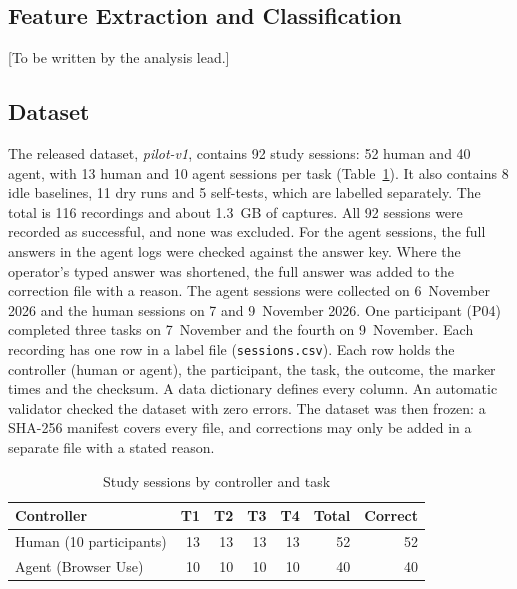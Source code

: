 \subsection{Feature Extraction and Classification}
\label{sec:method-analysis}
[To be written by the analysis lead.]

\subsection{Dataset}
\label{sec:method-dataset}
The released dataset, \textit{pilot-v1}, contains 92 study sessions: 52 human and 40 agent, with 13 human and 10 agent sessions per task (Table~\ref{tab:dataset}). It also contains 8 idle baselines, 11 dry runs and 5 self-tests, which are labelled separately. The total is 116 recordings and about 1.3~GB of captures. All 92 sessions were recorded as successful, and none was excluded. For the agent sessions, the full answers in the agent logs were checked against the answer key. Where the operator's typed answer was shortened, the full answer was added to the correction file with a reason. The agent sessions were collected on 6~November 2026 and the human sessions on 7 and 9~November 2026. One participant (P04) completed three tasks on 7~November and the fourth on 9~November. Each recording has one row in a label file (\texttt{sessions.csv}). Each row holds the controller (human or agent), the participant, the task, the outcome, the marker times and the checksum. A data dictionary defines every column. An automatic validator checked the dataset with zero errors. The dataset was then frozen: a SHA-256 manifest covers every file, and corrections may only be added in a separate file with a stated reason.

\begin{table}[t]
\centering
\caption{Study sessions by controller and task}
\label{tab:dataset}
\footnotesize
\begin{tabular}{@{}lrrrrrr@{}}
\toprule
Controller & T1 & T2 & T3 & T4 & Total & Correct \\
\midrule
Human (10 participants) & 13 & 13 & 13 & 13 & 52 & 52 \\
Agent (Browser Use)     & 10 & 10 & 10 & 10 & 40 & 40 \\
\bottomrule
\end{tabular}
\end{table}

